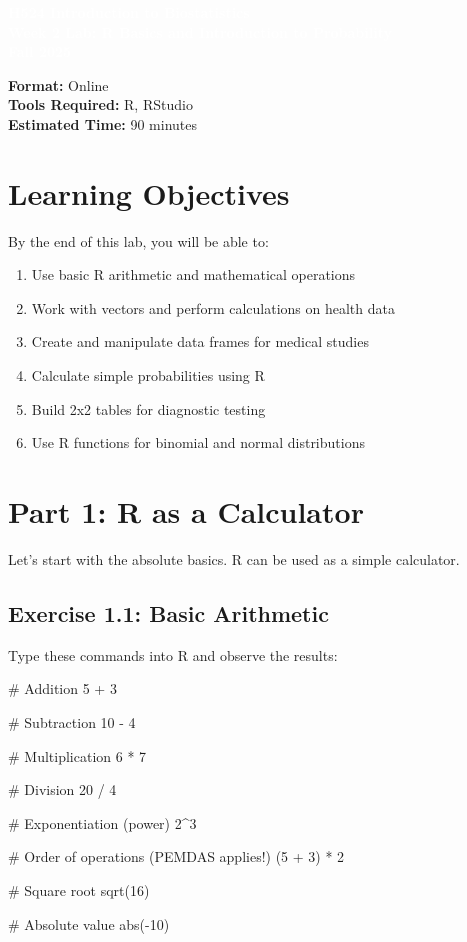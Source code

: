 \documentclass[11pt]{article}
\title{}
\author{}
\date{}
\begin{document}
\begin{tcolorbox}[colback=osaorange,colframe=black,boxrule=2pt,arc=0pt,left=3pt,right=3pt,top=6pt,bottom=6pt,boxsep=2pt]
\centering
\textcolor{white}{\textbf{\Large H524 Introduction to Biostatistics}}\\
\textcolor{white}{\textbf{\Large Week 2 Lab: R Basics and Introduction to Probability}}\\
\textcolor{white}{\textbf{\Large Fall 2025}}
\end{tcolorbox}

\vspace{8pt}

\noindent\textbf{Format:} Online\\
\textbf{Tools Required:} R, RStudio\\
\textbf{Estimated Time:} 90 minutes

\section{Learning Objectives}

By the end of this lab, you will be able to:
\begin{enumerate}
\item Use basic R arithmetic and mathematical operations
\item Work with vectors and perform calculations on health data
\item Create and manipulate data frames for medical studies
\item Calculate simple probabilities using R
\item Build 2x2 tables for diagnostic testing
\item Use R functions for binomial and normal distributions
\end{enumerate}

\section{Part 1: R as a Calculator}

Let's start with the absolute basics. R can be used as a simple calculator.

\subsection{Exercise 1.1: Basic Arithmetic}

Type these commands into R and observe the results:

\begin{rcode}
# Addition
5 + 3

# Subtraction
10 - 4

# Multiplication
6 * 7

# Division
20 / 4

# Exponentiation (power)
2^3

# Order of operations (PEMDAS applies!)
(5 + 3) * 2

# Square root
sqrt(16)

# Absolute value
abs(-10)
\end{rcode}
\end{document}
